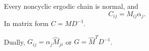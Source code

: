 Every noncyclic ergodic chain is normal, and
$$C_{ij} = M_{ij}\alpha_j.$$
In matrix form $C = MD^{-1}$.

Dually, $G_{ij} = \alpha_j\hat{M}_{ji}$ or $G = \hat{M}^T D^{-1}$.

